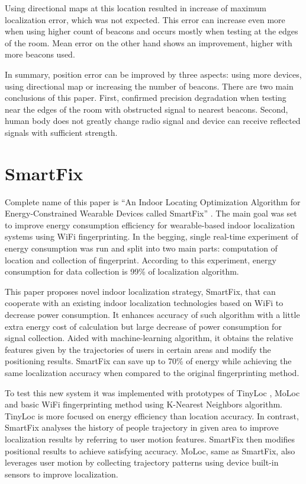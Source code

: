 Using directional maps at this location resulted in increase of maximum localization error, which was not expected. This error can increase even more when using higher count of beacons and occurs mostly when testing at the edges of the room. Mean error on the other hand shows an improvement, higher with more beacons used. 

In summary, position error can be improved by three aspects: using more devices, using directional map or increasing the number of beacons. There are two main conclusions of this paper. First, confirmed precision degradation when testing near the edges of the room with obstructed signal to nearest beacons. Second, human body does not greatly change radio signal and device can receive reflected signals with sufficient strength. 

\section{SmartFix}\label{sec:SmartFix}
Complete name of this paper is \enquote{An Indoor Locating Optimization Algorithm for Energy-Constrained Wearable Devices called SmartFix} \cite{SmartFix}. The main goal was set to improve energy consumption efficiency for wearable-based indoor localization systems using WiFi fingerprinting. In the begging, single real-time experiment of energy consumption was run and split into two main parts: computation of location and collection of fingerprint. According to this experiment, energy consumption for data collection is 99\% of localization algorithm.

This paper proposes novel indoor localization strategy, SmartFix, that can cooperate with an existing indoor localization technologies based on WiFi to decrease power consumption. It enhances accuracy of such algorithm with a little extra energy cost of calculation but large decrease of power consumption for signal collection. Aided with machine-learning algorithm, it obtains the relative features given by the trajectories of users in certain areas and modify the positioning results. SmartFix can save up to 70\% of energy while achieving the same localization accuracy when compared to the original fingerprinting method.

To test this new system it was implemented with prototypes of TinyLoc \cite{TinyLoc}, MoLoc \cite{MoLoc} and basic WiFi fingerprinting method using K-Nearest Neighbors algorithm. TinyLoc is more focused on energy efficiency than location accuracy. In contrast, SmartFix analyses the history of people trajectory in given area to improve localization results by referring to user motion features. SmartFix then modifies positional results to achieve satisfying accuracy. MoLoc, same as SmartFix, also leverages user motion by collecting trajectory patterns using device built-in sensors to improve localization.

